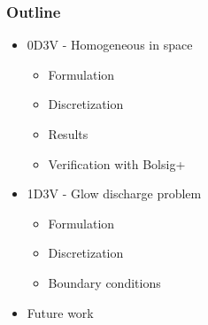 \documentclass[mathserif, aspectratio=169]{beamer}
\begin{document}
\begin{frame}
	\frametitle{Outline}
	\begin{itemize}
		\item 0D3V - Homogeneous in space
		\begin{itemize}
			\item Formulation
			\item Discretization
			\item Results
			\item Verification with Bolsig+
		\end{itemize}
		\item 1D3V - Glow discharge problem
		\begin{itemize}
			\item Formulation
			\item Discretization
			\item Boundary conditions
		\end{itemize}
		\item Future work
	\end{itemize}
\end{frame}
\end{document}
